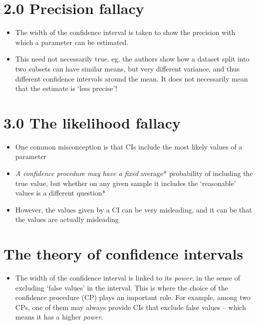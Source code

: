 \documentclass[
]{book}
\providecommand{\tightlist}{%
  \setlength{\itemsep}{0pt}\setlength{\parskip}{0pt}}
\begin{document}
\hypertarget{precision-fallacy}{%
\section{2.0 Precision fallacy}\label{precision-fallacy}}

\begin{itemize}
\tightlist
\item
  The width of the confidence interval is taken to show the precision with which a parameter can be estimated.
\item
  This need not necessarily true. eg. the authors show how a dataset split into two subsets can have similar means, but very different variance, and thus different confidence intervals around the mean. It does not necessarily mean that the estimate is `less precise'!
\end{itemize}

\hypertarget{the-likelihood-fallacy}{%
\section{3.0 The likelihood fallacy}\label{the-likelihood-fallacy}}

\begin{itemize}
\tightlist
\item
  One common misconception is that CIs include the most likely values of a parameter
\item
  \emph{A confidence procedure may have a fixed }average* probability of including the true value, but whether on any given sample it includes the `reasonable' values is a different question*
\item
  However, the values given by a CI can be very misleading, and it can be that the values are actually misleading
\end{itemize}

\hypertarget{the-theory-of-confidence-intervals}{%
\section{The theory of confidence intervals}\label{the-theory-of-confidence-intervals}}

\begin{itemize}
\tightlist
\item
  The width of the confidence interval is linked to its \emph{power}, in the sense of excluding `false values' in the interval. This is where the choice of the confidence procedure (CP) plays an important role. For example, among two CPs, one of them may always provide CIs that exclude false values -- which means it has a higher \emph{power}.
\end{itemize}
\end{document}
